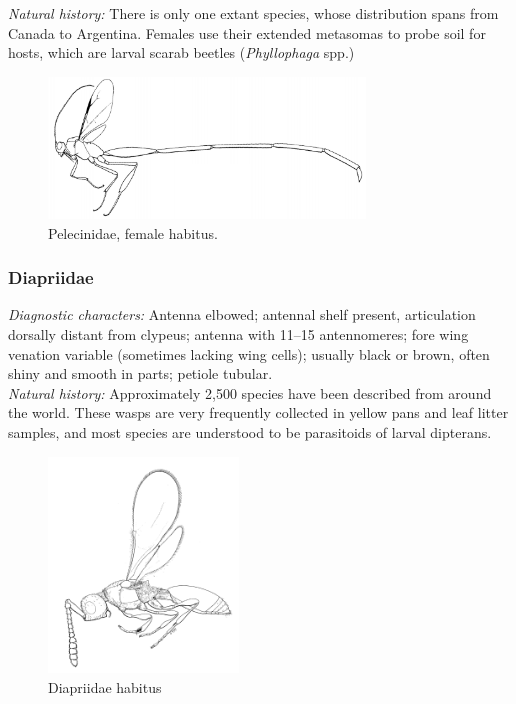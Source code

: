 \documentclass[letterpaper, 11pt]{article}
\begin{document}
\noindent{}\textit{Natural history:} There is only one extant species, whose distribution spans from Canada to Argentina. Females use their extended metasomas to probe soil for hosts, which are larval scarab beetles (\textit{Phyllophaga} spp.)\\

\begin{figure}[ht!]
  \centering
    \includegraphics[width=0.75\textwidth]{PelecinidHabitus}
  \caption{Pelecinidae, female habitus. \citep[][Fig. 198]{goulet1993hymenoptera}}
  \label{fig:pelecinid1}
\end{figure}

\subsubsection{Diapriidae}
\noindent{}\textit{Diagnostic characters:} Antenna elbowed; antennal shelf present, articulation dorsally distant from clypeus; antenna with 11--15 antennomeres; fore wing venation variable (sometimes lacking wing cells); usually black or brown, often shiny and smooth in parts; petiole tubular.\\

\noindent{}\textit{Natural history:} Approximately 2,500 species have been described from around the world. These wasps are very frequently collected in yellow pans and leaf litter samples, and most species are understood to be parasitoids of larval dipterans.\\

\begin{figure}[ht!]
  \centering
    \includegraphics[width=0.45\textwidth]{DiapriidHabitus}
  \caption{Diapriidae habitus \citep[][Fig. 206]{goulet1993hymenoptera}}
  \label{fig:diapriid1}
\end{figure}
\end{document}
